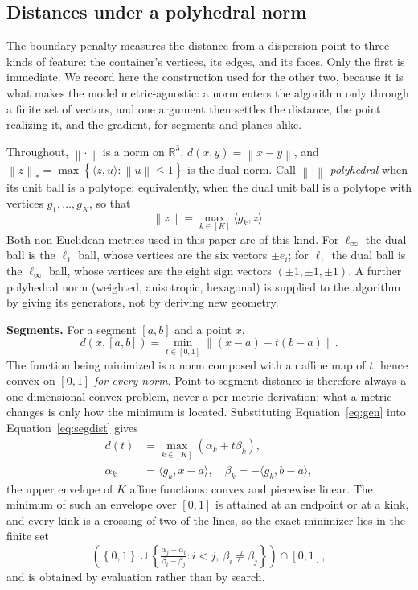 \documentclass[preprint,12pt]{elsarticle}
\theoremstyle{remark}
\def \R {\mathbb{R}}
\newcommand{\ang}[1]{\langle #1 \rangle}
\newcommand{\set}[1]{\left\{ #1 \right\}}
\def \norm#1{\left\|#1 \right\|}
\newcommand{\paren}[1]{\left( #1 \right)}
\begin{document}
\subsection{Distances under a polyhedral norm}
\label{sec:polyhedral}

The boundary penalty measures the distance from a dispersion point to three
kinds of feature: the container's vertices, its edges, and its faces. Only the
first is immediate. We record here the construction used for the other two,
because it is what makes the model metric-agnostic: a norm enters the algorithm
only through a finite set of vectors, and one argument then settles the
distance, the point realizing it, and the gradient, for segments and planes
alike.

Throughout, $\norm{\cdot}$ is a norm on $\R^3$, $d(x, y) = \norm{x - y}$, and
$\norm{z}_* = \max \set{\ang{z, u} : \norm{u} \le 1}$ is the dual norm. Call
$\norm{\cdot}$ \emph{polyhedral} when its unit ball is a polytope; equivalently,
when the dual unit ball is a polytope with vertices $g_1, \dots, g_K$, so that
\begin{equation}
  \norm{z} = \max_{k \in [K]} \ang{g_k, z}.
  \label{eq:gen}
\end{equation}
Both non-Euclidean metrics used in this paper are of this kind. For
$\ell_\infty$ the dual ball is the $\ell_1$ ball, whose vertices are the six
vectors $\pm e_i$; for $\ell_1$ the dual ball is the $\ell_\infty$ ball, whose
vertices are the eight sign vectors $(\pm 1, \pm 1, \pm 1)$. A further
polyhedral norm (weighted, anisotropic, hexagonal) is supplied to the algorithm
by giving its generators, not by deriving new geometry.

\textbf{Segments.} For a segment $[a, b]$ and a point $x$,
\begin{equation}
  d(x, [a, b]) = \min_{t \in [0, 1]} \norm{(x - a) - t (b - a)}.
  \label{eq:segdist}
\end{equation}
The function being minimized is a norm composed with an affine map of $t$, hence
convex on $[0, 1]$ \emph{for every norm}. Point-to-segment distance is therefore
always a one-dimensional convex problem, never a per-metric derivation; what a
metric changes is only how the minimum is located. Substituting
Equation~\ref{eq:gen} into Equation~\ref{eq:segdist} gives
\begin{align*}
  d(t) &= \max_{k \in [K]} \paren{\alpha_k + t \beta_k}, \\
  \alpha_k &= \ang{g_k, x - a}, \quad \beta_k = -\ang{g_k, b - a},
\end{align*}
the upper envelope of $K$ affine functions: convex and piecewise linear. The
minimum of such an envelope over $[0, 1]$ is attained at an endpoint or at a
kink, and every kink is a crossing of two of the lines, so the exact minimizer
lies in the finite set
\begin{equation*}
  \paren{\set{0, 1} \cup \set{\tfrac{\alpha_j - \alpha_i}{\beta_i - \beta_j}
  : i < j, \ \beta_i \ne \beta_j}} \cap [0, 1],
\end{equation*}
and is obtained by evaluation rather than by search.
\end{document}
